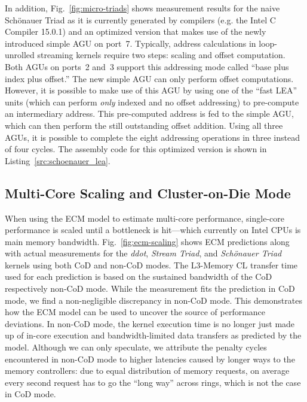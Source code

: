 \documentclass{llncs}
\begin{document}
In addition, Fig.~\ref{fig:micro-triads} shows measurement results for the
naive Sch\"onauer Triad as it is currently generated by compilers (e.g. the
Intel C Compiler 15.0.1) and an optimized version that makes use of the newly
introduced simple \ac{AGU} on port~7. Typically, address calculations in
loop-unrolled streaming kernels require two steps: scaling and offset
computation. Both \ac{AGU}s on ports~2 and~3 support this addressing mode
called ``base plus index plus offset.'' The new simple \ac{AGU} can only
perform offset computations. However, it is possible to make use of this
\ac{AGU} by using one of the ``fast LEA'' units (which can perform
\textit{only} indexed and no offset addressing) to pre-compute an intermediary
address. This pre-computed address is fed to the simple \ac{AGU}, which can
then perform the still outstanding offset addition.  Using all three \ac{AGU}s,
it is possible to complete the eight addressing operations in three instead of
four cycles. The assembly code for this optimized version is shown in
Listing~\ref{src:schoenauer_lea}.
\subsection{Multi-Core Scaling and Cluster-on-Die Mode}

When using the ECM model to estimate multi-core performance, single-core
performance is scaled until a bottleneck is hit---which currently on Intel CPUs
is main memory bandwidth.  Fig.~\ref{fig:ecm-scaling} shows ECM predictions
along with actual measurements for the \textit{ddot}, \textit{Stream Triad},
and \textit{Sch\"onauer Triad} kernels using both \ac{CoD} and non-\ac{CoD}
modes. The L3-Memory CL transfer time
used for each prediction is based on the sustained bandwidth of the \ac{CoD}
respectively non-\ac{CoD} mode. While the measurement fits the prediction in
\ac{CoD} mode, we find a non-negligible discrepancy in non-\ac{CoD} mode. This
demonstrates how the ECM model can be used to uncover the source of performance deviations.
In non-\ac{CoD} mode, the kernel execution time is no
longer just made up of in-core execution and bandwidth-limited data transfers
as predicted by the model. Although we can only speculate, we attribute the
penalty cycles encountered in non-\ac{CoD} mode to higher latencies caused by
longer ways to the memory controllers: due to equal distribution of memory
requests, on average every second request has to go the ``long way'' across
rings, which is not the case in \ac{CoD} mode.
\end{document}
